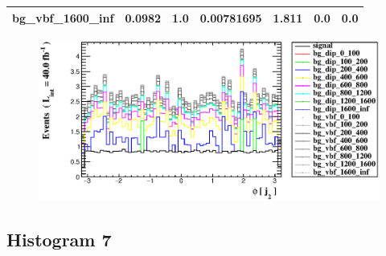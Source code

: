 \documentclass[a4paper, 10pt]{article}
\begin{document}
\begin{table}[H]
\begin{center}
\begin{tabular}{|m{23.0mm}|m{23.0mm}|m{18.0mm}|m{19.0mm}|m{19.0mm}|m{19.0mm}|m{19.0mm}|}
      \hline
      {\cellcolor{white}         bg\_vbf\_1600\_inf}& {\cellcolor{white}         0.0982}& {\cellcolor{white}         1.0}& {\cellcolor{white}         0.00781695}& {\cellcolor{white}         1.811}& {\cellcolor{green}         0.0}& {\cellcolor{green}         0.0}\\
\hline
    \end{tabular}
  \end{center}
\end{table}

\begin{figure}[H]
  \begin{center}
    \includegraphics[scale=0.45]{selection_5.eps}\\
\caption{   }
  \end{center}
\end{figure}
      \newpage
\subsection{ Histogram 7}
\end{document}
